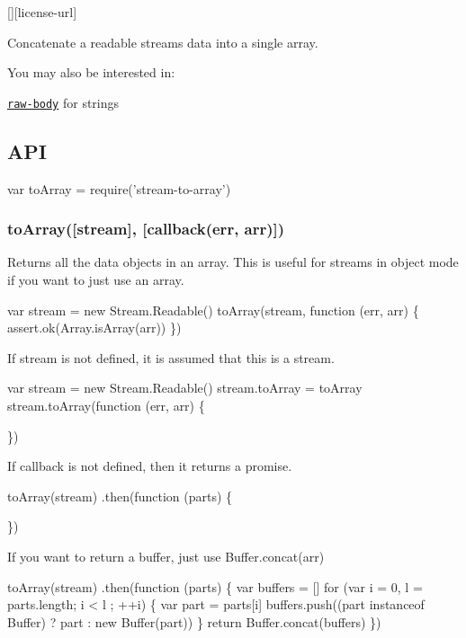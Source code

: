 \href{https://npmjs.org/package/stream-to-array}{\tt } \href{https://travis-ci.org/stream-utils/stream-to-array}{\tt } \href{https://coveralls.io/r/stream-utils/stream-to-array?branch=master}{\tt } \href{https://david-dm.org/stream-utils/stream-to-array}{\tt } \mbox{[}\mbox{]}\mbox{[}license-\/url\mbox{]} \href{https://npmjs.org/package/stream-to-array}{\tt }

Concatenate a readable stream\textquotesingle{}s data into a single array.

You may also be interested in\+:


\begin{DoxyItemize}
\item \href{https://github.com/stream-utils/raw-body}{\tt raw-\/body} for strings
\end{DoxyItemize}

\subsection*{A\+PI}


\begin{DoxyCode}
var toArray = require('stream-to-array')
\end{DoxyCode}


\subsubsection*{to\+Array(\mbox{[}stream\mbox{]}, \mbox{[}callback(err, arr)\mbox{]})}

Returns all the data objects in an array. This is useful for streams in object mode if you want to just use an array.


\begin{DoxyCode}
var stream = new Stream.Readable()
toArray(stream, function (err, arr) \{
  assert.ok(Array.isArray(arr))
\})
\end{DoxyCode}


If {\ttfamily stream} is not defined, it is assumed that {\ttfamily this} is a stream.


\begin{DoxyCode}
var stream = new Stream.Readable()
stream.toArray = toArray
stream.toArray(function (err, arr) \{

\})
\end{DoxyCode}


If {\ttfamily callback} is not defined, then it returns a promise.


\begin{DoxyCode}
toArray(stream)
  .then(function (parts) \{

  \})
\end{DoxyCode}


If you want to return a buffer, just use {\ttfamily Buffer.\+concat(arr)}


\begin{DoxyCode}
toArray(stream)
  .then(function (parts) \{
    var buffers = []
    for (var i = 0, l = parts.length; i < l ; ++i) \{
      var part = parts[i]
      buffers.push((part instanceof Buffer) ? part : new Buffer(part))
    \}
    return Buffer.concat(buffers)
  \})
\end{DoxyCode}
 